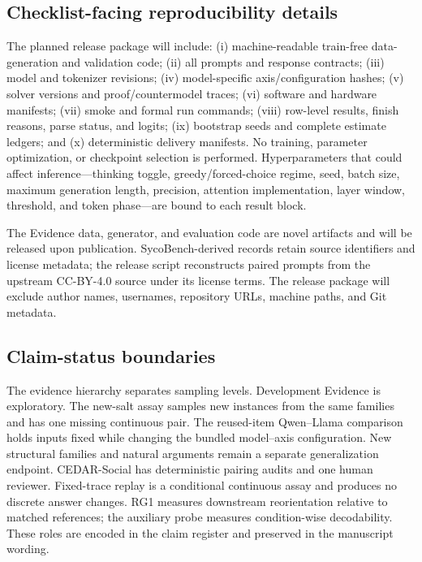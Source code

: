 \documentclass[letterpaper]{article}
\begin{document}
\subsection{Checklist-facing reproducibility details}

The planned release package will include: (i) machine-readable train-free data-generation and validation code; (ii) all prompts and response contracts; (iii) model and tokenizer revisions; (iv) model-specific axis/configuration hashes; (v) solver versions and proof/countermodel traces; (vi) software and hardware manifests; (vii) smoke and formal run commands; (viii) row-level results, finish reasons, parse status, and logits; (ix) bootstrap seeds and complete estimate ledgers; and (x) deterministic delivery manifests.  No training, parameter optimization, or checkpoint selection is performed.  Hyperparameters that could affect inference---thinking toggle, greedy/forced-choice regime, seed, batch size, maximum generation length, precision, attention implementation, layer window, threshold, and token phase---are bound to each result block.

The Evidence data, generator, and evaluation code are novel artifacts and will be released upon publication.  SycoBench-derived records retain source identifiers and license metadata; the release script reconstructs paired prompts from the upstream CC-BY-4.0 source under its license terms.  The release package will exclude author names, usernames, repository URLs, machine paths, and Git metadata.

\subsection{Claim-status boundaries}

The evidence hierarchy separates sampling levels.  Development Evidence is exploratory.  The new-salt assay samples new instances from the same families and has one missing continuous pair.  The reused-item Qwen--Llama comparison holds inputs fixed while changing the bundled model--axis configuration.  New structural families and natural arguments remain a separate generalization endpoint.  CEDAR-Social has deterministic pairing audits and one human reviewer.  Fixed-trace replay is a conditional continuous assay and produces no discrete answer changes.  RG1 measures downstream reorientation relative to matched references; the auxiliary probe measures condition-wise decodability.  These roles are encoded in the claim register and preserved in the manuscript wording.


\end{document}
